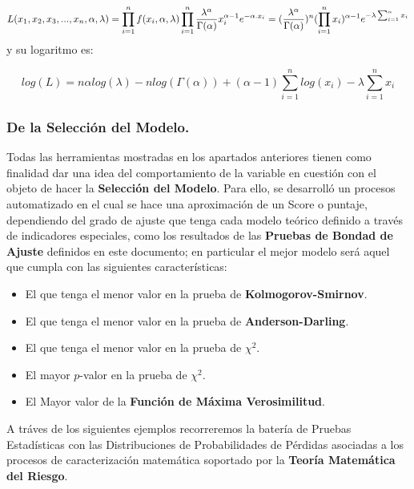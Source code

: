 \documentclass[10pt,]{article}
\providecommand{\tightlist}{%
  \setlength{\itemsep}{0pt}\setlength{\parskip}{0pt}}
\begin{document}
\[L(x_1, x_2, x_3, ..., x_n, \alpha, \lambda)=\prod_{i=1}^{n}f(x_i, \alpha, \lambda)\\ \prod_{i=1}^{n}\frac{\lambda^\alpha}{\Gamma(\alpha)}x_i^{\alpha-1}e^{-\alpha.x_i}=(\frac{\lambda^\alpha}{\Gamma(\alpha)})^n (\prod_{i=1}^{n}x_i)^{\alpha-1}e^{-\lambda\sum_{i=1}^{n} x_i} \]
y su logaritmo es:

\[log(L)=n\alpha log(\lambda)-n log(\Gamma(\alpha))+(\alpha-1)\sum_{i=1}^{n}log(x_i)-\lambda\sum_{i=1}^{n}x_i\]

\hypertarget{de-la-seleccion-del-modelo.}{%
\subsubsection{De la Selección del
Modelo.}\label{de-la-seleccion-del-modelo.}}

Todas las herramientas mostradas en los apartados anteriores tienen como
finalidad dar una idea del comportamiento de la variable en cuestión con
el objeto de hacer la \textbf{Selección del Modelo}. Para ello, se
desarrolló un procesos automatizado en el cual se hace una aproximación
de un Score o puntaje, dependiendo del grado de ajuste que tenga cada
modelo teórico definido a través de indicadores especiales, como los
resultados de las \textbf{Pruebas de Bondad de Ajuste} definidos en este
documento; en particular el mejor modelo será aquel que cumpla con las
siguientes características:

\begin{itemize}
\tightlist
\item
  El que tenga el menor valor en la prueba de
  \textbf{Kolmogorov-Smirnov}.\\
\item
  El que tenga el menor valor en la prueba de
  \textbf{Anderson-Darling}.\\
\item
  El que tenga el menor valor en la prueba de \(\chi^2\).\\
\item
  El mayor \(p\)-valor en la prueba de \(\chi^2\).\\
\item
  El Mayor valor de la \textbf{Función de Máxima Verosimilitud}.
\end{itemize}

A tráves de los siguientes ejemplos recorreremos la batería de Pruebas
Estadísticas con las Distribuciones de Probabilidades de Pérdidas
asociadas a los procesos de caracterización matemática soportado por la
\textbf{Teoría Matemática del Riesgo}.
\end{document}
